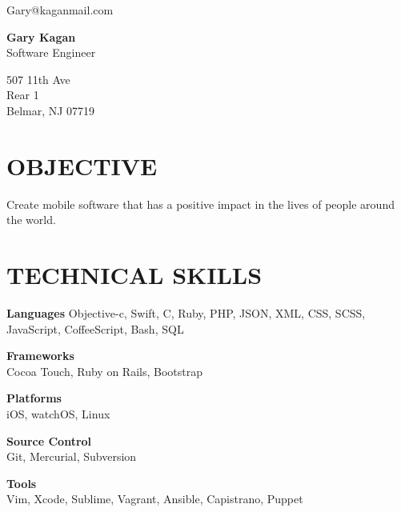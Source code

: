 \documentclass{res}
\begin{document}
 
\begin{multicols}{3}
\begin{flushleft}
Gary@kaganmail.com\\[0.3em]
\end{flushleft}
\columnbreak
\begin{center}
{\huge\textbf{Gary Kagan}}\\
Software Engineer
\end{center}
\columnbreak
\begin{flushright}
507 11th Ave\\
Rear 1\\
Belmar, NJ 07719
\end{flushright}
\end{multicols}


\begin{resume}
\section{OBJECTIVE}          
    Create mobile software that has a positive impact in the lives of people around the world.

\section{TECHNICAL SKILLS}
    \textbf{Languages}
    Objective-c, Swift, C, Ruby, PHP, JSON, XML, CSS, SCSS, JavaScript, CoffeeScript, Bash, SQL

    \begin{multicols}{2}
    \begin{flushleft}
    \textbf{Frameworks}\\
    Cocoa Touch, Ruby on Rails, Bootstrap
    \end{flushleft}
    \columnbreak
    \textbf{Platforms}\\
    iOS, watchOS, Linux
    \end{multicols}

    \begin{multicols}{2}
    \begin{flushleft}
    \textbf{Source Control}\\
    Git, Mercurial, Subversion
    \end{flushleft}
    \columnbreak
    \textbf{Tools}\\
    Vim, Xcode, Sublime, Vagrant, Ansible, Capistrano, Puppet
    \end{multicols}



\end{resume}
\end{document}
